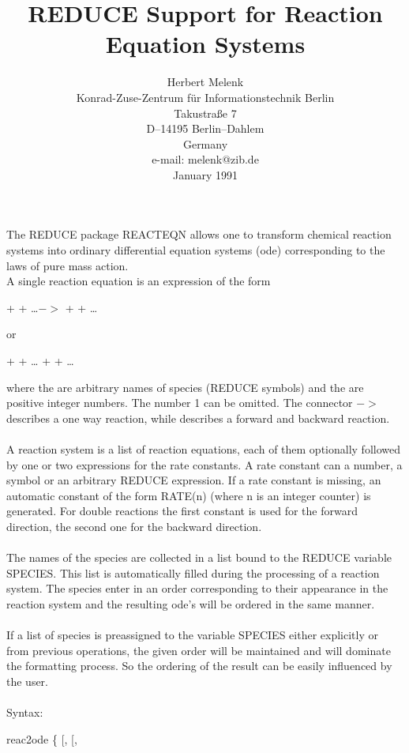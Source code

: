 \documentclass[a4paper]{article}
\title{REDUCE Support for Reaction Equation Systems}
\author{Herbert Melenk \\
	Konrad-Zuse-Zentrum f\"ur Informationstechnik Berlin \\
	Takustra{\ss}e 7 \\
	D--14195 Berlin--Dahlem \\
	Germany \\
	e-mail: melenk@zib.de \\
	January 1991}
\date{}
\begin{document}
\maketitle


The REDUCE package REACTEQN allows one to transform chemical reaction 
systems into ordinary differential equation systems (ode) 
corresponding to the laws of pure mass action.  \\
A single reaction equation is an expression of the form

  +  + \ldots $->$  +  + \ldots

 or

  +  + \ldots \meta{}  +  + \ldots

where the  are arbitrary names of species (REDUCE symbols)
and the  are positive integer numbers. The number 1
can be omitted. The connector $->$ describes a one way reaction,
while \meta{\ } describes a forward and backward reaction. \\
\ \\
A reaction system is a list of reaction equations, each of them
optionally followed by one or two expressions for the rate
constants. A rate constant can a number, a symbol or an 
arbitrary REDUCE expression. If a rate constant is missing,
an automatic constant of the form RATE(n) (where n is an
integer counter) is generated. For double reactions the
first constant is used for the forward direction, the second
one for the backward direction. \\
\ \\
The names of the species are collected in a list bound to
the REDUCE variable SPECIES. This list is automatically filled
during the processing of a reaction system. The species enter
in an order corresponding to their appearance in the reaction
system and the resulting ode's will be ordered in the same manner.  \\
\ \\
If a list of species is preassigned to the variable
SPECIES either explicitly or from previous operations, the 
given order will be maintained and will dominate the formatting
process. So the ordering of the result can be easily influenced
by the user. \\
\ \\

Syntax:

 reac2ode \{  {[}, {[},\meta{rate}{]}{]} 
\end{document}
